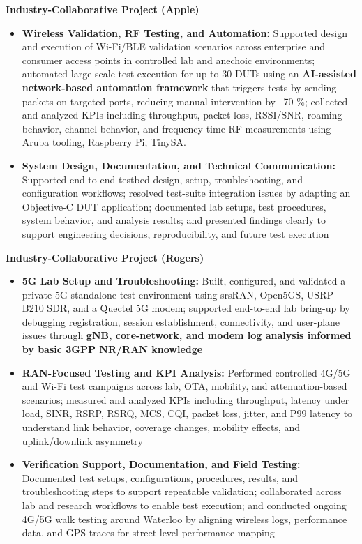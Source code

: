 \documentclass[letterpaper,11pt]{article}
\begin{document}
\item \textbf{Industry-Collaborative Project (Apple)}
\begin{itemize}[leftmargin=1.5em]
\item \textbf{Wireless Validation, RF Testing, and Automation:} Supported design and execution of Wi-Fi/BLE validation scenarios across enterprise and consumer access points in controlled lab and anechoic environments; automated large-scale test execution for up to 30 DUTs using an \textbf{AI-assisted network-based automation framework} that triggers tests by sending packets on targeted ports, reducing manual intervention by ~70 \%; collected and analyzed KPIs including throughput, packet loss, RSSI/SNR, roaming behavior, channel behavior, and frequency-time RF measurements using Aruba tooling, Raspberry Pi, TinySA.

    \item \textbf{System Design, Documentation, and Technical Communication:} Supported end-to-end testbed design, setup, troubleshooting, and configuration workflows; resolved test-suite integration issues by adapting an Objective-C DUT application; documented lab setups, test procedures, system behavior, and analysis results; and presented findings clearly to support engineering decisions, reproducibility, and future test execution
\end{itemize}

\item \textbf{Industry-Collaborative Project (Rogers)}
\begin{itemize}[leftmargin=1.5em]
  \item \textbf{5G Lab Setup and Troubleshooting:} Built, configured, and validated a private 5G standalone test environment using srsRAN, Open5GS, USRP B210 SDR, and a Quectel 5G modem; supported end-to-end lab bring-up by debugging registration, session establishment, connectivity, and user-plane issues through \textbf{gNB, core-network, and modem log analysis informed by basic 3GPP NR/RAN knowledge}

    \item \textbf{RAN-Focused Testing and KPI Analysis:} Performed controlled 4G/5G and Wi-Fi test campaigns across lab, OTA, mobility, and attenuation-based scenarios; measured and analyzed KPIs including throughput, latency under load, SINR, RSRP, RSRQ, MCS, CQI, packet loss, jitter, and P99 latency to understand link behavior, coverage changes, mobility effects, and uplink/downlink asymmetry

    \item \textbf{Verification Support, Documentation, and Field Testing:} Documented test setups, configurations, procedures, results, and troubleshooting steps to support repeatable validation; collaborated across lab and research workflows to enable test execution; and conducted ongoing 4G/5G walk testing around Waterloo by aligning wireless logs, performance data, and GPS traces for street-level performance mapping
\end{itemize}
 
\end{document}
